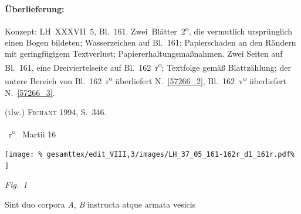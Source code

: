 %  
%
%
%
\frenchspacing
%
\begin{ledgroupsized}[r]{120mm}
\footnotesize
\pstart
\noindent\textbf{Überlieferung:}
\pend
\end{ledgroupsized}
%
\begin{ledgroupsized}[r]{114mm}
\footnotesize
\pstart \parindent -6mm
%
Konzept: LH~XXXVII~5, Bl.~161.
Zwei~Blätter~2\textsuperscript{o}, die vermutlich ursprünglich einen Bogen bildeten;
Wasserzeichen auf Bl.~161;
Papierschaden an den Rändern mit geringfügigem Textverlust;
Papiererhaltungsmaßnahmen.
Zwei Seiten auf Bl.~161, eine Dreiviertelseite auf Bl.~162~r\textsuperscript{o};
Textfolge gemäß Blattzählung;
der untere Bereich von Bl.~162~r\textsuperscript{o} überliefert N.~\ref{57266_2}, Bl.~162~v\textsuperscript{o} überliefert N.~\ref{57266_3}.
\pend
\end{ledgroupsized}
%
\begin{ledgroupsized}[r]{114mm}
\footnotesize
\pstart
\parindent -6mm
%
(tlw.) \cite{01056}\textsc{Fichant} 1994, S.~346.
\pend%
\end{ledgroupsized}
%
%
%
\frenchspacing
\vspace{8mm}
\pstart%
\normalsize%
\noindent%
~r\textsuperscript{o}\rbrack\
\pend
%
\count{}%
\count{}%
\count{}
\pstart
\noindent
\raggedleft
Martii 16
\pend
%
\vspace{2.0em} %
\centerline{%
\texttt{[image: \%
gesamttex/edit\_VIII,3/images/LH\_37\_05\_161-162r\_d1\_161r.pdf\%
]}} 
\vspace{0.5em}
\centerline{%
\lbrack\textit{Fig.~1}\rbrack%
}
\vspace{1.5em}
%
\pstart
\noindent
Sint duo corpora  
%
\textit{A}, \textit{B} instructa atque armata vesicis%
\protect{} 
%
